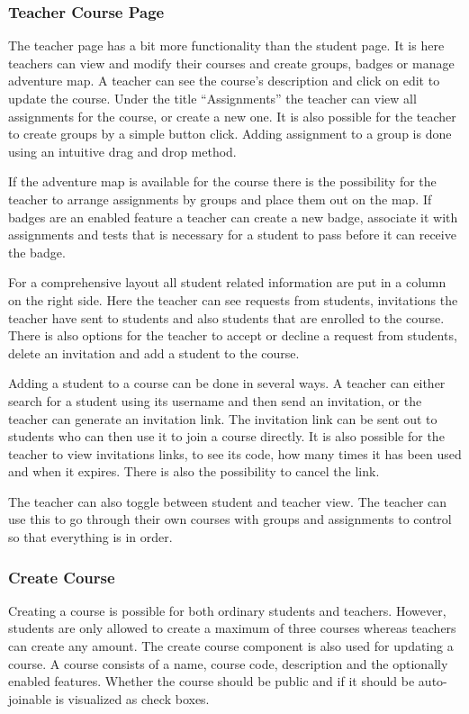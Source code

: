 \subsubsection{Teacher Course Page}
The teacher page has a bit more functionality than the student page. It is here teachers can view and modify their courses and create groups, badges or manage adventure map. A teacher can see the course's description and click on edit to update the course. Under the title ``Assignments'' the teacher can view all assignments for the course, or create a new one. It is also possible for the teacher to create groups by a simple button click. Adding assignment to a group is done using an intuitive drag and drop method. 

If the adventure map is available for the course there is the possibility for the teacher to arrange assignments by groups and place them out on the map. If badges are an enabled feature a teacher can create a new badge, associate it with assignments and tests that is necessary for a student to pass before it can receive the badge.

For a comprehensive layout all student related information are put in a column on the right side. Here the teacher can see requests from students, invitations the teacher have sent to students and also students that are enrolled to the course. There is also options for the teacher to accept or decline a request from students, delete an invitation and add a student to the course. 

Adding a student to a course can be done in several ways. A teacher can either search for a student using its username and then send an invitation, or the teacher can generate an invitation link. The invitation link can be sent out to students who can then use it to join a course directly. It is also possible for the teacher to view invitations links, to see its code, how many times it has been used and when it expires. There is also the possibility to cancel the link.

The teacher can also toggle between student and teacher view. The teacher can use this to go through their own courses with groups and assignments to control so that everything is in order. 

\subsubsection{Create Course}
Creating a course is possible for both ordinary students and teachers. However, students are only allowed to create a maximum of three courses whereas teachers can create any amount. The create course component is also used for updating a course. A course consists of a name, course code, description and the optionally enabled features. Whether the course should be public and if it should be auto-joinable is visualized as check boxes.

